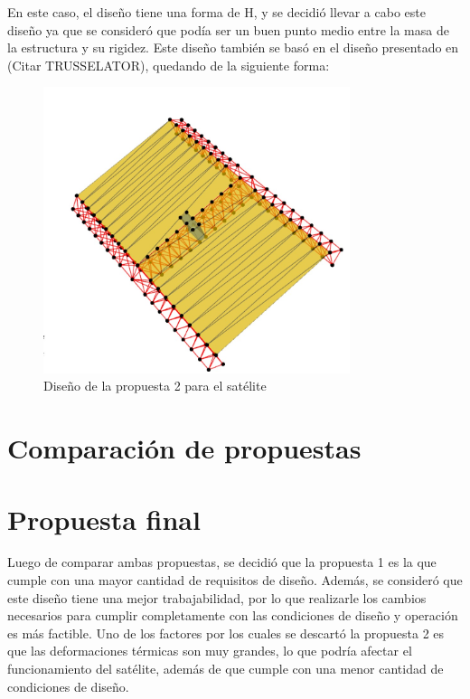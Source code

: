 En este caso, el diseño tiene una forma de H, y se decidió llevar a cabo este diseño ya que se consideró que podía ser un buen punto medio entre la masa de la estructura y su rigidez. Este diseño también se basó en el diseño presentado en (Citar TRUSSELATOR), quedando de la siguiente forma:

\begin{figure}[H]
    \centering
    \includegraphics[width=0.8\textwidth]{GRAFICOS_DISENO_BENO/propuesta2.png}
    \caption{Diseño de la propuesta 2 para el satélite}
    \label{fig:propuesta2}
\end{figure}


\newpage
\section{Comparación de propuestas}


\newpage
\section{Propuesta final}

Luego de comparar ambas propuestas, se decidió que la propuesta 1 es la que cumple con una mayor cantidad de requisitos de diseño. Además, se consideró que este diseño tiene una mejor trabajabilidad, por lo que realizarle los cambios necesarios para cumplir completamente con las condiciones de diseño y operación es más factible. Uno de los factores por los cuales se descartó la propuesta 2 es que las deformaciones térmicas son muy grandes, lo que podría afectar el funcionamiento del satélite, además de que cumple con una menor cantidad de condiciones de diseño.

